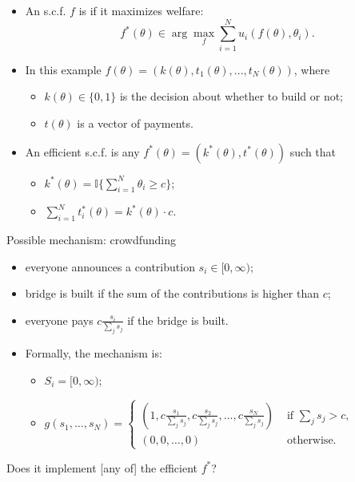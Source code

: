 \documentclass[english,handout]{beamer}		%
\def\lyxframeend{} %
\begin{document}
\begin{itemize}
	\item An s.c.f. $f$ is  if it maximizes welfare:
	$$f^*(\theta) \in \arg \max_{f} \sum_{i=1}^{N} u_i(f(\theta),\theta_i).$$
	\pause
	\item In this example $f(\theta) = (k(\theta), t_1(\theta), ..., t_N(\theta))$, where
	\begin{itemize}
		\item $k(\theta) \in \{0,1\}$ is the decision about whether to build or not;
		\item $t(\theta)$ is a vector of payments.
	\end{itemize}
	\item An efficient s.c.f. is any $f^*(\theta)=(k^*(\theta),t^*(\theta))$ such that 
	\begin{itemize}
		\item $k^*(\theta) = \mathbb{I} \{ \sum_{i=1}^{N} \theta_i \geq c \}$;
		\item $\sum_{i=1}^{N} t^*_i(\theta) = k^*(\theta) \cdot c$.
	\end{itemize}
\end{itemize}
\lyxframeend


\begin{exampleblock}{Possible mechanism: crowdfunding}
	\begin{itemize}
		\item everyone announces a contribution $s_{i}\in[0,\infty)$;
		\item bridge is built if the sum of the contributions is higher than $c$;
		\item everyone pays $c\frac{s_{i}}{\sum_{j}s_{j}}$ if the bridge is built.
		\pause
		\item Formally, the mechanism is:
		\begin{itemize}
			\item $S_{i}= [0,\infty)$;
			\item $g(s_{1},\dots,s_{N})=
			\begin{cases}
				\left(1,c\frac{s_{1}}{\sum_{j}s_{j}},c\frac{s_{2}}{\sum_{j}s_{j}},\dots,c\frac{s_{N}}{\sum_{j}s_{j}}\right) &\text{ if } \sum_{j}s_{j}>c, \\
				(0,0,\dots,0) &\text{ otherwise.}
			\end{cases}
			$
		\end{itemize}
	\end{itemize}
\end{exampleblock}
\pause
Does it implement [any of] the efficient $f^*$?
\lyxframeend
\end{document}
